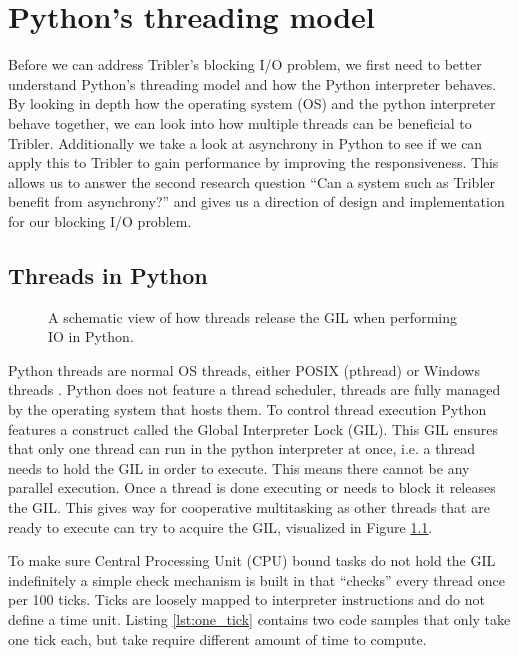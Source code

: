 \chapter{Python's threading model}
\label{cpt:pythons_thread_model}

Before we can address Tribler's blocking I/O problem, we first need to better understand Python's threading model and how the Python interpreter behaves.
By looking in depth how the operating system (OS) and the python interpreter behave together, we can look into how multiple threads can be beneficial to Tribler.
Additionally we take a look at asynchrony in Python to see if we can apply this to Tribler to gain performance by improving the responsiveness.
This allows us to answer the second research question \enquote{Can a system such as Tribler benefit from asynchrony?} and gives us a direction of design and implementation for our blocking I/O problem.

\section{Threads in Python}

\begin{figure}[!h]
	\caption{A schematic view of how threads release the GIL when performing IO in Python.}
	\label{fig:python_threads_release_gil}
\end{figure}

Python threads are normal OS threads, either POSIX (pthread) or Windows threads \cite{beazley2010understanding, beazley2009inside}.
Python does not feature a thread scheduler, threads are fully managed by the operating system that hosts them.
To control thread execution Python features a construct called the Global Interpreter Lock (GIL).
This GIL ensures that only one thread can run in the python interpreter at once, i.e. a thread needs to hold the GIL in order to execute.
This means there cannot be any parallel execution.
Once a thread is done executing or needs to block it releases the GIL.
This gives way for cooperative multitasking as other threads that are ready to execute can try to acquire the GIL, visualized in Figure \ref{fig:python_threads_release_gil}.

To make sure Central Processing Unit (CPU) bound tasks do not hold the GIL indefinitely a simple check mechanism is built in that \enquote{checks} every thread once per 100 ticks.
Ticks are loosely mapped to interpreter instructions and do not define a time unit.
Listing \ref{lst:one_tick} contains two code samples that only take one tick each, but take require different amount of time to compute.

